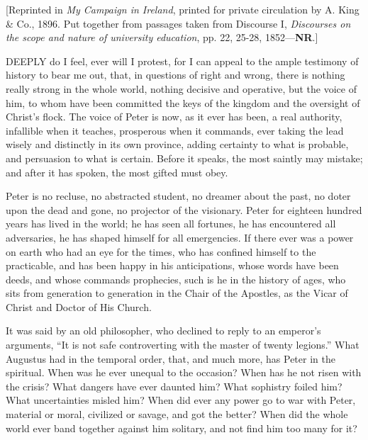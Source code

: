 
[Reprinted in \emph{My Campaign in Ireland},
printed for private circulation by A. King \& Co., 1896. Put
together from passages taken from Discourse I, \emph{Discourses on the
scope and nature of university education}, pp. 22, 25-28, 1852—\textbf{NR}.]

DEEPLY
do I feel, ever will I protest, for I can appeal to the ample
testimony of history to bear me out, that, in questions of right and
wrong, there is nothing really strong in the whole world, nothing
decisive and operative, but the voice of him, to whom have been
committed the keys of the kingdom and the oversight of Christ's flock.
The voice of Peter is now, as it ever has been, a real authority,
infallible when it teaches, prosperous when it commands, ever taking
the lead wisely and distinctly in its own province, adding certainty
to what is probable, and persuasion to what is certain. Before it
speaks, the most saintly may mistake; and after it has spoken, the
most gifted must obey.

Peter is no recluse, no abstracted student, no
dreamer about the past, no doter upon the dead and gone, no projector
of the visionary. Peter for eighteen hundred years has lived in the
world; he has seen all fortunes, he has encountered all adversaries,
he has shaped himself for all emergencies. If there ever was a power
on earth who had an eye for the times, who has confined himself to the
practicable, and has been happy in his anticipations, whose
words have been deeds, and whose commands prophecies, such is he in
the history of ages, who sits from generation to generation in the
Chair of the Apostles, as the Vicar of Christ and Doctor of His
Church.

It was said by an old philosopher, who declined
to reply to an emperor's arguments, ``It is not safe controverting with
the master of twenty legions.'' What Augustus had in the temporal
order, that, and much more, has Peter in the spiritual. When was he
ever unequal to the occasion? When has he not risen with the crisis?
What dangers have ever daunted him? What sophistry foiled him? What
uncertainties misled him? When did ever any power go to war with
Peter, material or moral, civilized or savage, and got the better?
When did the whole world ever band together against him solitary, and
not find him too many for it?

